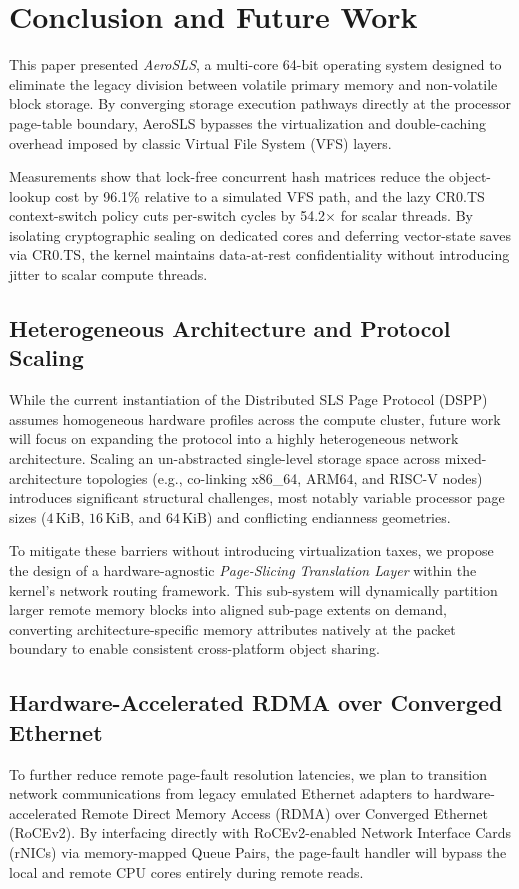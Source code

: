 \documentclass[sigconf]{acmart}
\begin{document}
\section{Conclusion and Future Work}
\label{sec:conclusion}

This paper presented \textit{AeroSLS}, a multi-core 64-bit
operating system designed to eliminate the legacy division
between volatile primary memory and non-volatile block storage.
By converging storage execution pathways directly at the
processor page-table boundary, AeroSLS bypasses the
virtualization and double-caching overhead imposed by classic
Virtual File System (VFS) layers.

Measurements show that lock-free concurrent hash matrices
reduce the object-lookup cost by 96.1\% relative to a simulated
VFS path, and the lazy CR0.TS context-switch policy cuts
per-switch cycles by 54.2$\times$ for scalar threads.  By
isolating cryptographic sealing on dedicated cores and deferring
vector-state saves via CR0.TS, the kernel maintains
data-at-rest confidentiality without introducing jitter to
scalar compute threads.

\subsection{Heterogeneous Architecture and Protocol Scaling}
While the current instantiation of the Distributed SLS Page
Protocol (DSPP) assumes homogeneous hardware profiles across the
compute cluster, future work will focus on expanding the
protocol into a highly heterogeneous network architecture.
Scaling an un-abstracted single-level storage space across
mixed-architecture topologies (e.g., co-linking x86\_64, ARM64,
and RISC-V nodes) introduces significant structural challenges,
most notably variable processor page sizes ($4\,\text{KiB}$,
$16\,\text{KiB}$, and $64\,\text{KiB}$) and conflicting
endianness geometries.

To mitigate these barriers without introducing virtualization
taxes, we propose the design of a hardware-agnostic
\textit{Page-Slicing Translation Layer} within the kernel's
network routing framework.  This sub-system will dynamically
partition larger remote memory blocks into aligned sub-page
extents on demand, converting architecture-specific memory
attributes natively at the packet boundary to enable consistent
cross-platform object sharing.

\subsection{Hardware-Accelerated RDMA over Converged Ethernet}
To further reduce remote page-fault resolution latencies, we
plan to transition network communications from legacy emulated
Ethernet adapters to hardware-accelerated Remote Direct Memory
Access (RDMA) over Converged Ethernet (RoCEv2).  By interfacing
directly with RoCEv2-enabled Network Interface Cards (rNICs) via
memory-mapped Queue Pairs, the page-fault handler will bypass
the local and remote CPU cores entirely during remote reads.
\end{document}
